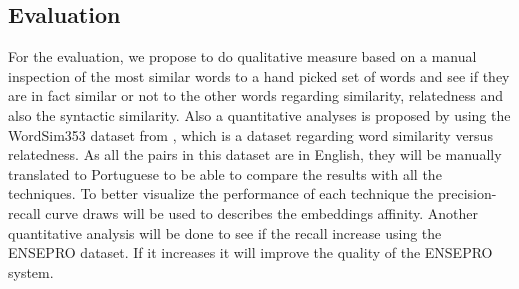 \subsection{Evaluation}\label{chap:methodsandmaterials:evaluation}

For the evaluation, we propose to do qualitative measure based on a manual inspection of the most similar words to a hand picked set of words and see if they are in fact similar or not to the other words regarding similarity, relatedness and also the syntactic similarity.
Also a quantitative analyses is proposed by using the WordSim353 dataset from , which is a dataset regarding word similarity versus relatedness. As all the pairs in this dataset are in English, they will be manually translated to Portuguese to be able to compare the results with all the techniques.
To better visualize the performance of each technique the precision-recall curve draws will be used to describes the embeddings affinity.
Another quantitative analysis will be done to see if the recall increase using the ENSEPRO dataset. If it increases it will improve the quality of the ENSEPRO system. 






















